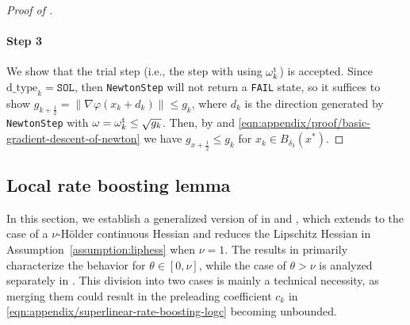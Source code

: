 \begin{proof}[Proof of ]
    \paragraph{Step 3}
    We show that the trial step (i.e., the step with using $\omega_k^{\mathrm{t}}$) is accepted.
    Since $\text{d\_type}_k = \texttt{SOL}$, then \texttt{NewtonStep} will not return a \texttt{FAIL} state, so it suffices to show $g_{k+\frac{1}{2}} = \| \nabla \varphi(x_k + d_k) \| \leq g_k$, 
    where $d_k$ is the direction generated by \texttt{NewtonStep} with $\omega = \omega_k^{\mathrm{t}} \leq \sqrt{g_k}$.
    Then, by  and \eqref{eqn:appendix/proof/basic-gradient-descent-of-newton} we have 
    $g_{x + \frac{1}{2}} \leq g_k$ for $x_k \in B_{\delta_3}(x^*)$.
\end{proof}

\subsection{Local rate boosting lemma}
\label{sec:appendix/local-rate-boosting}

In this section, we establish a generalized version of  in  and , 
which extends to the case of a $\nu$-H\"older continuous Hessian and reduces the Lipschitz Hessian in Assumption~\ref{assumption:liphess} when $\nu = 1$.
The results in  primarily characterize the behavior for $\theta \in [0, \nu]$,
while the case of $\theta > \nu$ is analyzed separately in .
This division into two cases is mainly a technical necessity, 
as merging them could result in the preleading coefficient $c_k$ in \eqref{eqn:appendix/superlinear-rate-boosting-logc} becoming unbounded.


